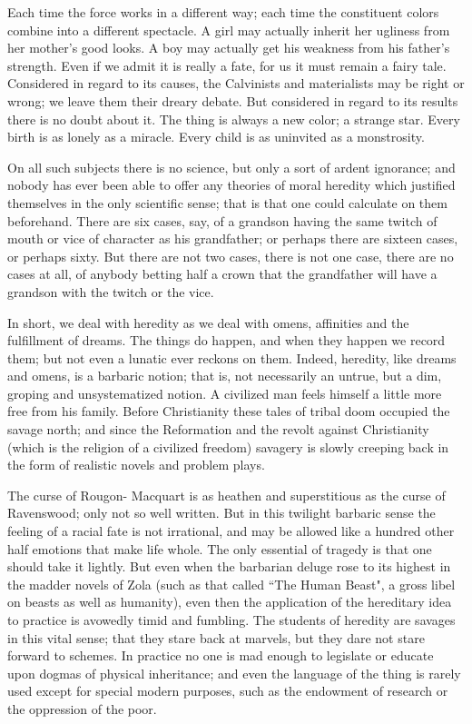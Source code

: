 \documentclass[final,10pt,letterpaper,twocolumn,openany]{book}
\begin{document}
Each time
the force works in a different way; each time the constituent colors
combine into a different spectacle. A girl may actually inherit her ugliness
from her mother's good looks. A boy may actually get his weakness from
his father's strength. Even if we admit it is really a fate, for us it must
remain a fairy tale. Considered in regard to its causes, the Calvinists and
materialists may be right or wrong; we leave them their dreary debate. But
considered in regard to its results there is no doubt about it. The thing is
always a new color; a strange star. Every birth is as lonely as a miracle.
Every child is as uninvited as a monstrosity.

On all such subjects there is no science, but only a sort of ardent
ignorance; and nobody has ever been able to offer any theories of moral
heredity which justified themselves in the only scientific sense; that is that
one could calculate on them beforehand. There are six cases, say, of a
grandson having the same twitch of mouth or vice of character as his
grandfather; or perhaps there are sixteen cases, or perhaps sixty. But there
are not two cases, there is not one case, there are no cases at all, of
anybody betting half a crown that the grandfather will have a grandson
with the twitch or the vice. 

In short, we deal with heredity as we deal with
omens, affinities and the fulfillment of dreams. The things do happen, and
when they happen we record them; but not even a lunatic ever reckons on
them. Indeed, heredity, like dreams and omens, is a barbaric notion; that is,
not necessarily an untrue, but a dim, groping and unsystematized notion. A
civilized man feels himself a little more free from his family. Before
Christianity these tales of tribal doom occupied the savage north; and
since the Reformation and the revolt against Christianity (which is the
religion of a civilized freedom) savagery is slowly creeping back in the
form of realistic novels and problem plays. 

The curse of Rougon-
Macquart is as heathen and superstitious as the curse of Ravenswood; only
not so well written. But in this twilight barbaric sense the feeling of a
racial fate is not irrational, and may be allowed like a hundred other half
emotions that make life whole. The only essential of tragedy is that one
should take it lightly. But even when the barbarian deluge rose to its
highest in the madder novels of Zola (such as that called ``The Human
Beast", a gross libel on beasts as well as humanity), even then the
application of the hereditary idea to practice is avowedly timid and
fumbling. The students of heredity are savages in this vital sense; that they
stare back at marvels, but they dare not stare forward to schemes. In
practice no one is mad enough to legislate or educate upon dogmas of
physical inheritance; and even the language of the thing is rarely used
except for special modern purposes, such as the endowment of research or
the oppression of the poor.
\end{document}
